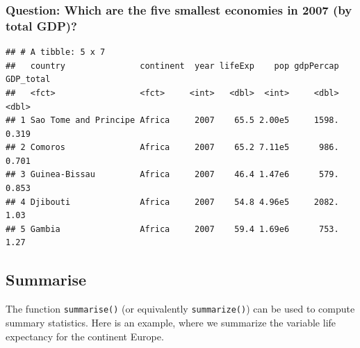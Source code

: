 \documentclass[11pt,]{article}
\newenvironment{Shaded}{\begin{snugshade}}{\end{snugshade}}
\newcommand{\KeywordTok}[1]{\textcolor[rgb]{0.13,0.29,0.53}{\textbf{#1}}}
\newcommand{\DataTypeTok}[1]{\textcolor[rgb]{0.13,0.29,0.53}{#1}}
\newcommand{\DecValTok}[1]{\textcolor[rgb]{0.00,0.00,0.81}{#1}}
\newcommand{\StringTok}[1]{\textcolor[rgb]{0.31,0.60,0.02}{#1}}
\newcommand{\OperatorTok}[1]{\textcolor[rgb]{0.81,0.36,0.00}{\textbf{#1}}}
\newcommand{\NormalTok}[1]{#1}
\begin{document}
\subsubsection{Question: Which are the five smallest economies in 2007
(by total
GDP)?}\label{question-which-are-the-five-smallest-economies-in-2007-by-total-gdp}

\begin{Shaded}
\end{Shaded}

\begin{verbatim}
## # A tibble: 5 x 7
##   country               continent  year lifeExp    pop gdpPercap GDP_total
##   <fct>                 <fct>     <int>   <dbl>  <int>     <dbl>     <dbl>
## 1 Sao Tome and Principe Africa     2007    65.5 2.00e5     1598.     0.319
## 2 Comoros               Africa     2007    65.2 7.11e5      986.     0.701
## 3 Guinea-Bissau         Africa     2007    46.4 1.47e6      579.     0.853
## 4 Djibouti              Africa     2007    54.8 4.96e5     2082.     1.03 
## 5 Gambia                Africa     2007    59.4 1.69e6      753.     1.27
\end{verbatim}

\subsection{Summarise}\label{summarise}

The function \texttt{summarise()} (or equivalently \texttt{summarize()})
can be used to compute summary statistics. Here is an example, where we
summarize the variable life expectancy for the continent Europe.

\begin{Shaded}
\end{Shaded}
\end{document}
